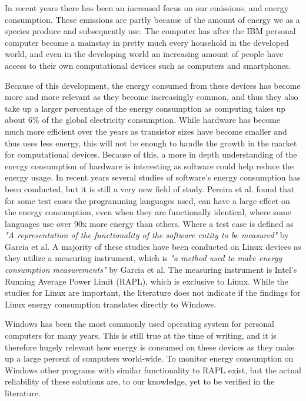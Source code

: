 In recent years there has been an increased focus on our emissions, and energy consumption. These emissions are partly because of the amount of energy we as a species produce and subsequently use. 
The computer has after the IBM personal computer become a mainstay in pretty much every household in the developed world, and even in the developing world an increasing amount of people have access to their own computational devices such as computers and smartphones\cite{DevelopedWorldPC}. 

Because of this development, the energy consumed from these devices has become more and more relevant as they become increasingly common, and thus they also take up a larger percentage of the energy consumption as computing takes up about 6\% of the global electricity consumption\cite*{somavat2011energy}.
While hardware has become much more efficient over the years as transistor sizes have become smaller and thus uses less energy, this will not be enough to handle the growth in the market for computational devices. Because of this, a more in depth understanding of the energy consumption of hardware is interesting as software could help reduce the energy usage\cite{somavat2011energy}. 
In recent years several studies of software's energy consumption has been conducted, but it is still a very new field of study. Pereira et al.\cite*{Pereira2017} found that for some test cases the programming languages used, can have a large effect on the energy consumption, even when they are functionally identical, where some languages use over 90x more energy than others. Where a test case is defined as \textit{"A representation of the functionality of the software entity to be measured"} by Garcia et al.\cite*{GarciaFEETINGS}
A majority of these studies have been conducted on Linux devices as they utilize a measuring instrument, which is \textit{"a method used to make energy consumption measurements"} by Garcia et al.\cite*{GarciaFEETINGS} The measuring instrument is Intel's Running Average Power Limit (RAPL), which is exclusive to Linux. While the studies for Linux are important, the literature does not indicate if the findings for Linux energy consumption translates directly to Windows\cite{Pereira2017}. 

Windows has been the most commonly used operating system for personal computers for many years. This is still true at the time of writing, and it is therefore hugely relevant how energy is consumed on these devices as they make up a large percent of computers world-wide\cite{OSShare}. To monitor energy consumption on Windows other programs with similar functionality to RAPL exist, but the actual reliability of these solutions are, to our knowledge, yet to be verified in the literature.

